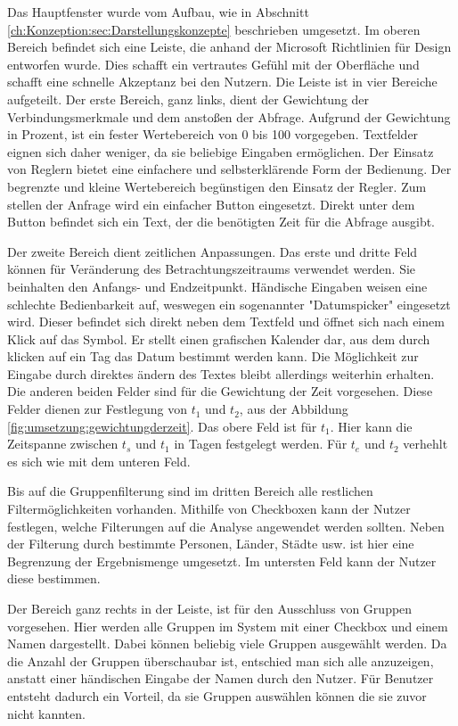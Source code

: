 Das Hauptfenster wurde vom Aufbau, wie in Abschnitt \ref{ch:Konzeption:sec:Darstellungskonzepte} beschrieben umgesetzt. Im oberen Bereich befindet sich eine Leiste, die anhand der Microsoft Richtlinien für Design entworfen wurde. Dies schafft ein vertrautes Gefühl mit der Oberfläche und schafft eine schnelle Akzeptanz bei den Nutzern. Die Leiste ist in vier Bereiche aufgeteilt. Der erste Bereich, ganz links, dient der Gewichtung der Verbindungsmerkmale und dem anstoßen der Abfrage. Aufgrund der Gewichtung in Prozent, ist ein fester Wertebereich von 0 bis 100 vorgegeben. Textfelder eignen sich daher weniger, da sie beliebige Eingaben ermöglichen. Der Einsatz von Reglern bietet eine einfachere und selbsterklärende Form der Bedienung. Der begrenzte und kleine Wertebereich begünstigen den Einsatz der Regler. Zum stellen der Anfrage wird ein einfacher Button eingesetzt. Direkt unter dem Button befindet sich ein Text, der die benötigten Zeit für die Abfrage ausgibt. 

Der zweite Bereich dient zeitlichen Anpassungen. Das erste und dritte Feld können für Veränderung des Betrachtungszeitraums verwendet werden. Sie beinhalten den Anfangs- und Endzeitpunkt. Händische Eingaben weisen eine schlechte Bedienbarkeit auf, weswegen ein sogenannter "Datumspicker" eingesetzt wird. Dieser befindet sich direkt neben dem Textfeld und öffnet sich nach einem Klick auf das Symbol. Er stellt einen grafischen Kalender dar, aus dem durch klicken auf ein Tag das Datum bestimmt werden kann. Die Möglichkeit zur Eingabe durch direktes ändern des Textes bleibt allerdings weiterhin erhalten. Die anderen beiden Felder sind für die Gewichtung der Zeit vorgesehen. Diese Felder dienen zur Festlegung von $t_1$ und $t_2$, aus der Abbildung \ref{fig:umsetzung:gewichtungderzeit}. Das obere Feld ist für $t_1$. Hier kann die Zeitspanne zwischen $t_{s}$ und $t_1$ in Tagen festgelegt werden. Für $t_{e}$ und $t_2$ verhehlt es sich wie mit dem unteren Feld.

Bis auf die Gruppenfilterung sind im dritten Bereich alle restlichen Filtermöglichkeiten vorhanden. Mithilfe von Checkboxen kann der Nutzer festlegen, welche Filterungen auf die Analyse angewendet werden sollten. Neben der Filterung durch bestimmte Personen, Länder, Städte usw. ist hier eine Begrenzung der Ergebnismenge umgesetzt. Im untersten Feld kann der Nutzer diese bestimmen.

Der Bereich ganz rechts in der Leiste, ist für den Ausschluss von Gruppen vorgesehen. Hier werden alle Gruppen im System mit einer Checkbox und einem Namen dargestellt. Dabei können beliebig viele Gruppen ausgewählt werden. Da die Anzahl der Gruppen überschaubar ist, entschied man sich alle anzuzeigen, anstatt einer händischen Eingabe der Namen durch den Nutzer. Für Benutzer entsteht dadurch ein Vorteil, da sie Gruppen auswählen können die sie zuvor nicht kannten.

